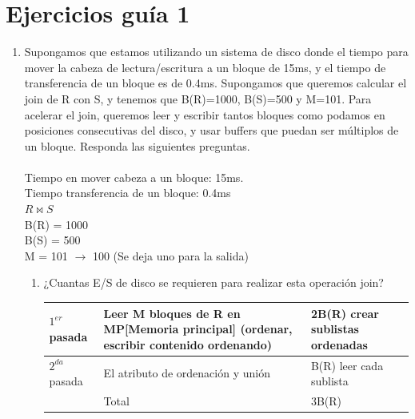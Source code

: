 \documentclass{templateNote}
\begin{document}


\portada
\margenes 


\section{Ejercicios guía 1}

\begin{enumerate}
    \item Supongamos que estamos utilizando un sistema de disco donde el tiempo para mover la cabeza de lectura/escritura a un bloque de 15ms, y el tiempo de transferencia de un bloque es de 0.4ms. Supongamos que queremos calcular el join de R con S, y tenemos que B(R)=1000, B(S)=500 y M=101. Para acelerar el join, queremos leer y escribir tantos bloques como podamos en posiciones consecutivas del disco, y usar buffers que puedan ser múltiplos de un bloque. Responda las siguientes preguntas. \\\\
    Tiempo en mover cabeza a un bloque: 15ms.\\
    Tiempo transferencia de un bloque: 0.4ms \\
    \underline{$R \Join S$}\\
    \hspace*{0.25cm} B(R) = 1000 \\
    \hspace*{0.25cm} B(S) = 500 \\
    \hspace*{0.25cm} M = 101 $\rightarrow$ 100 (Se deja uno para la salida)\\
    \begin{enumerate}[label=\alph*)]
        \item ¿Cuantas E/S de disco se requieren para realizar esta operación join? \\

        \begin{tabular}{|m{2cm}|m{6cm}|m{4cm}|}
            \hline
            $1^{er}$ pasada & Leer M bloques de R en MP[Memoria principal] (ordenar, escribir contenido ordenando) & 2B(R) crear sublistas ordenadas \\
            \hline
            $2^{da}$ pasada & El atributo de ordenación y unión & B(R) leer cada sublista \\
            \hline
            & Total & 3B(R) \\
            \hline
        \end{tabular}
        

\end{enumerate}
\end{enumerate}
\end{document}
